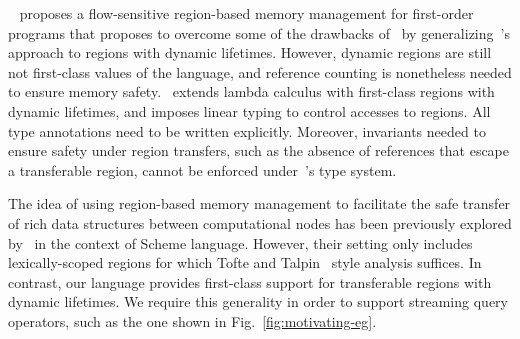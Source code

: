~\cite{HMN01} proposes a flow-sensitive region-based memory management
for first-order programs that proposes to overcome some of the
drawbacks of~\cite{tofte97} by generalizing~\cite{tofte97}'s approach
to regions with dynamic lifetimes. However, dynamic regions are still
not first-class values of the language, and reference counting is
nonetheless needed to ensure memory safety.~\cite{WW01} extends lambda
calculus with first-class regions with dynamic lifetimes, and imposes
linear typing to control accesses to regions. All type annotations
need to be written explicitly. Moreover, invariants needed to ensure
safety under region transfers, such as the absence of references that
escape a transferable region, cannot be enforced under~\cite{WW01}'s
type system.

The idea of using region-based memory management to facilitate the
safe transfer of rich data structures between computational nodes has
been previously explored by~\cite{gpu14} in the context of Scheme
language. However, their setting only includes lexically-scoped
regions for which Tofte and Talpin~\cite{tofte97} style analysis
suffices. In contrast, our language provides first-class support for
transferable regions with dynamic lifetimes. We require this
generality in order to support streaming query operators, such as the
one shown in Fig.~\ref{fig:motivating-eg}. 

